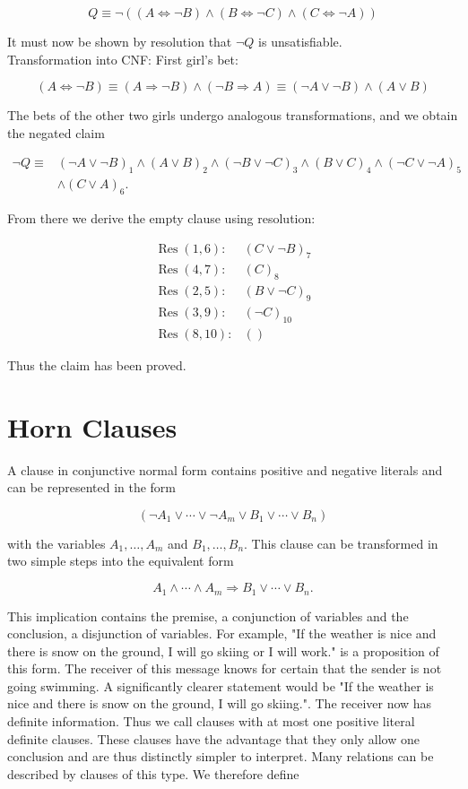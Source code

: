 \documentclass[10pt]{book}
\begin{document}
$$
Q \equiv \neg((A \Leftrightarrow \neg B) \wedge(B \Leftrightarrow \neg C) \wedge(C \Leftrightarrow \neg A))
$$

It must now be shown by resolution that $\neg Q$ is unsatisfiable.\\
Transformation into CNF: First girl's bet:

$$
(A \Leftrightarrow \neg B) \equiv(A \Rightarrow \neg B) \wedge(\neg B \Rightarrow A) \equiv(\neg A \vee \neg B) \wedge(A \vee B)
$$

The bets of the other two girls undergo analogous transformations, and we obtain the negated claim

$$
\begin{aligned}
\neg Q \equiv & (\neg A \vee \neg B)_{1} \wedge(A \vee B)_{2} \wedge(\neg B \vee \neg C)_{3} \wedge(B \vee C)_{4} \wedge(\neg C \vee \neg A)_{5} \\
& \wedge(C \vee A)_{6} .
\end{aligned}
$$

From there we derive the empty clause using resolution:

$$
\begin{array}{ll}
\operatorname{Res}(1,6): & (C \vee \neg B)_{7} \\
\operatorname{Res}(4,7): & (C)_{8} \\
\operatorname{Res}(2,5): & (B \vee \neg C)_{9} \\
\operatorname{Res}(3,9): & (\neg C)_{10} \\
\operatorname{Res}(8,10): & ()
\end{array}
$$

Thus the claim has been proved.

\section{Horn Clauses}
A clause in conjunctive normal form contains positive and negative literals and can be represented in the form

$$
\left(\neg A_{1} \vee \cdots \vee \neg A_{m} \vee B_{1} \vee \cdots \vee B_{n}\right)
$$

with the variables $A_{1}, \ldots, A_{m}$ and $B_{1}, \ldots, B_{n}$. This clause can be transformed in two simple steps into the equivalent form

$$
A_{1} \wedge \cdots \wedge A_{m} \Rightarrow B_{1} \vee \cdots \vee B_{n} .
$$

This implication contains the premise, a conjunction of variables and the conclusion, a disjunction of variables. For example, "If the weather is nice and there is snow on the ground, I will go skiing or I will work." is a proposition of this form. The receiver of this message knows for certain that the sender is not going swimming. A significantly clearer statement would be "If the weather is nice and there is snow on the ground, I will go skiing.". The receiver now has definite information. Thus we call clauses with at most one positive literal definite clauses. These clauses have the advantage that they only allow one conclusion and are thus distinctly simpler to interpret. Many relations can be described by clauses of this type. We therefore define
\end{document}
